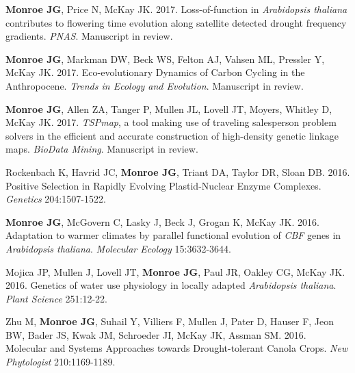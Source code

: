 \documentclass[12pt,english]{article}
\begin{document}
\begin{hangparas}{.5in}{1}

\hspace{1em}  \textbf{Monroe JG}, Price N, McKay JK. 2017. Loss-of-function in \textit{Arabidopsis thaliana} contributes to flowering time evolution along satellite detected drought frequency gradients. \textit{PNAS}. Manuscript in review.
\vspace{1ex}\par
\hspace{1em}  \textbf{Monroe JG}, Markman DW, Beck WS, Felton AJ, Vahsen ML, Pressler Y, McKay JK. 2017. Eco-evolutionary Dynamics of Carbon Cycling in the Anthropocene. \textit{Trends in Ecology and Evolution}. Manuscript in review.
\vspace{1ex}\par
\hspace{1em}  \textbf{Monroe JG}, Allen ZA, Tanger P, Mullen JL, Lovell JT, Moyers, Whitley D, McKay JK. 2017. \textit{TSPmap}, a tool making use of traveling salesperson problem solvers in the efficient and accurate construction of high-density genetic linkage maps. \textit{BioData Mining}. Manuscript in review.
\vspace{1ex}\par
\hspace{1em} Rockenbach K, Havrid JC, \textbf{Monroe JG}, Triant DA, Taylor DR, Sloan DB. 2016. Positive Selection in Rapidly Evolving Plastid-Nuclear Enzyme Complexes. \textit{Genetics} 204:1507-1522.
\vspace{1ex}\par
\hspace{1em} \textbf{Monroe JG}, McGovern C, Lasky J, Beck J, Grogan K, McKay JK. 2016. Adaptation to warmer climates by parallel functional evolution of \textit{CBF} genes in \textit{Arabidopsis thaliana}. \textit{Molecular Ecology} 15:3632-3644.
\vspace{1ex}\par
\hspace{1em} Mojica JP, Mullen J, Lovell JT, \textbf{Monroe JG}, Paul JR, Oakley CG, McKay JK. 2016. Genetics of water use physiology in locally adapted \textit{Arabidopsis thaliana}. \textit{Plant Science}  251:12-22.
\vspace{1ex}\par
\hspace{1em} Zhu M, \textbf{Monroe JG}, Suhail Y, Villiers F, Mullen J, Pater D, Hauser F, Jeon BW, Bader JS, Kwak JM, Schroeder JI, McKay JK, Assman SM. 2016. Molecular and Systems Approaches towards Drought-tolerant Canola Crops. \textit{New Phytologist} 210:1169-1189.
\end{hangparas}
\vspace{1ex}
\end{document}
